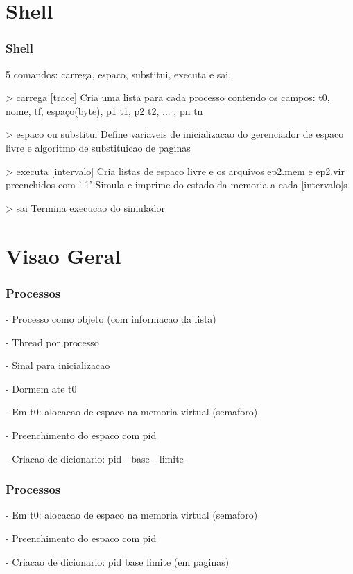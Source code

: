 \documentclass{beamer}
\begin{document}
\section{Shell}
\begin{frame}
\frametitle{Shell}

5 comandos: carrega, espaco, substitui, executa e sai.

> carrega [trace] 
  Cria uma lista para cada processo contendo os campos: 
  t0, nome, tf, espaço(byte), p1 t1, p2 t2, ... , pn tn

> espaco ou substitui
  Define variaveis de inicializacao do gerenciador de espaco livre e algoritmo de substituicao de paginas

> executa [intervalo]
  Cria listas de espaco livre e os arquivos ep2.mem e ep2.vir preenchidos com '-1'
  Simula e imprime do estado da memoria a cada [intervalo]s
  
> sai
  Termina execucao do simulador  

\end{frame}
\section{Visao Geral} 
\begin{frame}
\frametitle{Processos}

- Processo como objeto (com informacao da lista)

- Thread por processo

- Sinal para inicializacao

- Dormem ate t0

- Em t0: alocacao de espaco na memoria virtual (semaforo)

- Preenchimento do espaco com pid

- Criacao de dicionario: pid - base - limite
\justifying
\end{frame}


\begin{frame}
\frametitle{Processos}

- Em t0: alocacao de espaco na memoria virtual (semaforo)

- Preenchimento do espaco com pid

- Criacao de dicionario: pid  base  limite (em paginas)
\justifying
\end{frame}
\end{document}

